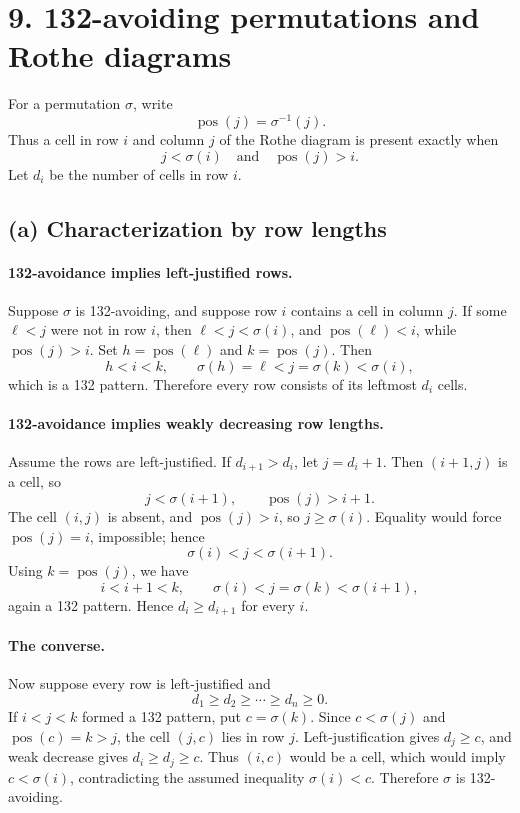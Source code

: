 \documentclass[11pt]{article}
\newcommand{\pos}{\operatorname{pos}}
\begin{document}
\section*{9. 132-avoiding permutations and Rothe diagrams}

For a permutation \(\sigma\), write
\[
    \pos(j)=\sigma^{-1}(j).
\]
Thus a cell in row \(i\) and column \(j\) of the Rothe diagram is present
exactly when
\[
    j<\sigma(i)\quad\text{and}\quad \pos(j)>i.
\]
Let \(d_i\) be the number of cells in row \(i\).

\subsection*{(a) Characterization by row lengths}

\paragraph{132-avoidance implies left-justified rows.}
Suppose \(\sigma\) is 132-avoiding, and suppose row \(i\) contains a cell in
column \(j\). If some \(\ell<j\) were not in row \(i\), then
\(\ell<j<\sigma(i)\), and \(\pos(\ell)<i\), while \(\pos(j)>i\). Set
\(h=\pos(\ell)\) and \(k=\pos(j)\). Then
\[
    h<i<k,\qquad \sigma(h)=\ell<j=\sigma(k)<\sigma(i),
\]
which is a 132 pattern. Therefore every row consists of its leftmost
\(d_i\) cells.

\paragraph{132-avoidance implies weakly decreasing row lengths.}
Assume the rows are left-justified. If \(d_{i+1}>d_i\), let
\(j=d_i+1\). Then \((i+1,j)\) is a cell, so
\[
    j<\sigma(i+1),\qquad \pos(j)>i+1.
\]
The cell \((i,j)\) is absent, and \(\pos(j)>i\), so \(j\geq\sigma(i)\).
Equality would force \(\pos(j)=i\), impossible; hence
\[
    \sigma(i)<j<\sigma(i+1).
\]
Using \(k=\pos(j)\), we have
\[
    i<i+1<k,\qquad \sigma(i)<j=\sigma(k)<\sigma(i+1),
\]
again a 132 pattern. Hence \(d_i\geq d_{i+1}\) for every \(i\).

\paragraph{The converse.}
Now suppose every row is left-justified and
\[
    d_1\geq d_2\geq\cdots\geq d_n\geq0.
\]
If \(i<j<k\) formed a 132 pattern, put \(c=\sigma(k)\). Since
\(c<\sigma(j)\) and \(\pos(c)=k>j\), the cell \((j,c)\) lies in row \(j\).
Left-justification gives \(d_j\geq c\), and weak decrease gives
\(d_i\geq d_j\geq c\). Thus \((i,c)\) would be a cell, which would imply
\(c<\sigma(i)\), contradicting the assumed inequality
\(\sigma(i)<c\). Therefore \(\sigma\) is 132-avoiding.
\end{document}

